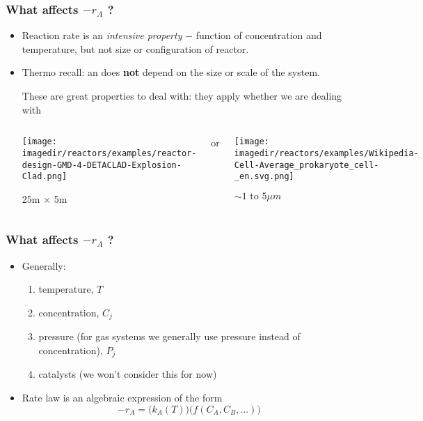 \begin{frame}[label=intensive-property]\frametitle{What affects $-r_A$ ?} 
	\begin{itemize}
		\item	 {Reaction rate is an \emph{\color{purple}intensive property} $-$ function of concentration and temperature, but not size or configuration of reactor.} 
		\item	Thermo recall: an {\color{purple}{intensive property}} does \textbf{not} depend on the size or scale of the system.
		
				These are great properties to deal with: they apply whether we are dealing with
				
			\begin{columns}[c]
					\begin{center}
						\texttt{[image: \\imagedir/reactors/examples/reactor-design-GMD-4-DETACLAD-Explosion-Clad.png]}
						
						25m $\times$ 5m
					\end{center}
					or
					\begin{center}
						\texttt{[image: \\imagedir/reactors/examples/Wikipedia-Cell-Average\_prokaryote\_cell-\_en.svg.png]}

						$\sim 1\text{ to }5\mu m$ 
					\end{center}
			\end{columns}
	\end{itemize}
\end{frame}

\begin{frame}\frametitle{What affects $-r_A$ ?} 
	\begin{itemize}
		\item	Generally: 
		\begin{enumerate}
			\item	temperature, $T$
			\item	concentration, $C_j$
			\item	pressure (for gas systems we generally use pressure instead of concentration), $P_j$
			\item	catalysts (we won't consider this for now)
		\end{enumerate}
		\item	Rate law is an algebraic expression of the form 
				\[
					-r_A = \Biggl(k_A(T)\Biggr)\Biggl(f(C_A, C_B, \ldots)\Biggr)
				\]
	\end{itemize}
\end{frame}

